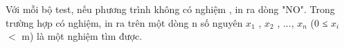 Với mỗi bộ test, nếu phương trình không có nghiệm , in ra dòng "NO". Trong trường hợp có nghiệm, in ra trên một dòng n số nguyên $x_{1}$ , $x_{2}$ , ..., $x_{n}$ (0 ≤ $x_{i}$ $<$ m) là một nghiệm tìm được.